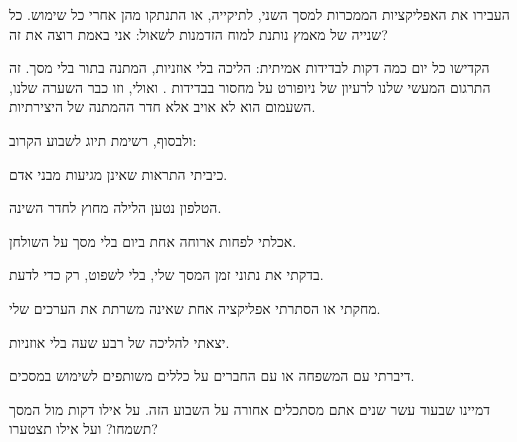 \begin{tipbox}
העבירו את האפליקציות הממכרות למסך השני, לתיקייה, או התנתקו מהן אחרי כל שימוש. כל שנייה של מאמץ נותנת למוח הזדמנות לשאול: אני באמת רוצה את זה?
\end{tipbox}

\begin{tipbox}
הקדישו כל יום כמה דקות לבדידות אמיתית: הליכה בלי אוזניות, המתנה בתור בלי מסך. זה התרגום המעשי שלנו לרעיון של ניופורט על מחסור בבדידות \parencite{newport2019}. ואולי, וזו כבר השערה שלנו, השעמום הוא לא אויב אלא חדר ההמתנה של היצירתיות.
\end{tipbox}

ולבסוף, רשימת תיוג לשבוע הקרוב:


\begin{checklist}
  \item כיביתי התראות שאינן מגיעות מבני אדם.
  \item הטלפון נטען הלילה מחוץ לחדר השינה.
  \item אכלתי לפחות ארוחה אחת ביום בלי מסך על השולחן.
  \item בדקתי את נתוני זמן המסך שלי, בלי לשפוט, רק כדי לדעת.
  \item מחקתי או הסתרתי אפליקציה אחת שאינה משרתת את הערכים שלי.
  \item יצאתי להליכה של רבע שעה בלי אוזניות.
  \item דיברתי עם המשפחה או עם החברים על כללים משותפים לשימוש במסכים.
\end{checklist}

\begin{thinkbox}
דמיינו שבעוד עשר שנים אתם מסתכלים אחורה על השבוע הזה. על אילו דקות מול המסך תשמחו? ועל אילו תצטערו?
\end{thinkbox}
